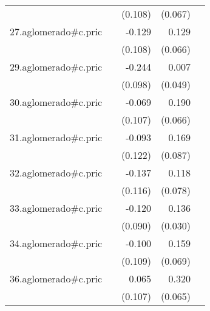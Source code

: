 {\begin{longtable}{l*{4}{D{.}{.}{-1}}}
            &                     &     (0.108)         &     (0.067)         &                     \\
\addlinespace
27.aglomerado#c.pric&                     &      -0.129         &       0.129         &                     \\
            &                     &     (0.108)         &     (0.066)         &                     \\
\addlinespace
29.aglomerado#c.pric&                     &      -0.244\sym{*}  &       0.007         &                     \\
            &                     &     (0.098)         &     (0.049)         &                     \\
\addlinespace
30.aglomerado#c.pric&                     &      -0.069         &       0.190\sym{**} &                     \\
            &                     &     (0.107)         &     (0.066)         &                     \\
\addlinespace
31.aglomerado#c.pric&                     &      -0.093         &       0.169         &                     \\
            &                     &     (0.122)         &     (0.087)         &                     \\
\addlinespace
32.aglomerado#c.pric&                     &      -0.137         &       0.118         &                     \\
            &                     &     (0.116)         &     (0.078)         &                     \\
\addlinespace
33.aglomerado#c.pric&                     &      -0.120         &       0.136\sym{***}&                     \\
            &                     &     (0.090)         &     (0.030)         &                     \\
\addlinespace
34.aglomerado#c.pric&                     &      -0.100         &       0.159\sym{*}  &                     \\
            &                     &     (0.109)         &     (0.069)         &                     \\
\addlinespace
36.aglomerado#c.pric&                     &       0.065         &       0.320\sym{***}&                     \\
            &                     &     (0.107)         &     (0.065)         &                     \\

\end{longtable}}

